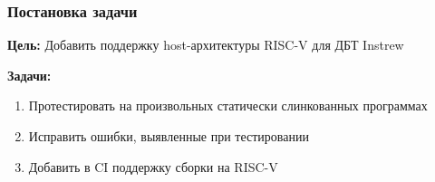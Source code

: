 \documentclass{beamer}
\begin{document}
\begin{frame}
	\frametitle{Постановка задачи}
	\textbf{Цель:} Добавить поддержку host-архитектуры RISC-V для ДБТ Instrew

	\vspace{5mm}
	\textbf{Задачи:}
	\begin{enumerate}
		\item Протестировать на произвольных статически слинкованных программах
		\item Исправить ошибки, выявленные при тестировании
		\item Добавить в CI поддержку сборки на RISC-V
	\end{enumerate}
\end{frame}

\end{document}
